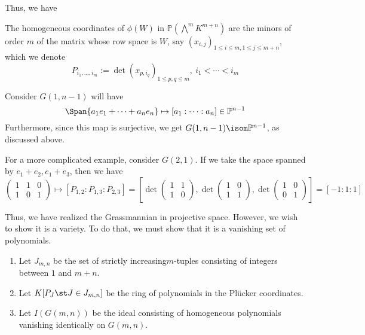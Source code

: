 \documentclass[11pt,leqno,oneside]{amsart}
\numberwithin{thm}{section}
\renewcommand{\P}{\mathbb{P}}
\newcommand{\ExtP}{\bigwedge}
\begin{document}
Thus, we have
\begin{thm}
  The homogeneous coordinates of \(\phi(W)\) in \(\P(\ExtP^m
  K^{m+n})\) are the minors of order \(m\) of the matrix whose row
  space is \(W\), say \((x_{i,j})_{1 \leq i \leq m, 1 \leq j \leq
    m+n}\), which we denote \[
    P_{i_1, \ldots, i_m} := \det(x_{p,i_q})_{1
      \leq p,q \leq m}, \ i_1 
    < \cdots < i_m
  \]
\end{thm}
\begin{example}
  Consider \(G(1,n-1)\) will have \[
    \Span\{a_1 e_1 + \cdots + a_n e_n\} \mapsto [a_1: \cdots :a_n] \in
    \P^{n-1} 
  \]
  Furthermore, since this map is surjective, we get \(G(1,n-1) \isom
  \P^{n-1}\), as discussed above.

  For a more complicated example, consider \(G(2,1)\). If we take the
  space spanned by \(e_1+e_2,e_1+e_3\), then we have \[
    \left(
      \begin{array}{ccc}
        1&1&0\\
        1&0&1
      \end{array}
\right) \mapsto [P_{1,2}:P_{1,3}:P_{2,3}] = \left[ \det \left(
    \begin{array}{cc}
      1&1\\
      1&0
    \end{array}
\right), \det \left(
  \begin{array}{cc}
    1&0\\
    1&1
  \end{array}
\right), \det \left(
  \begin{array}{cc}
    1&0\\
    0&1
  \end{array}
\right) \right] = [-1:1:1]
  \]
  
\end{example}
Thus, we have realized the Grassmannian in projective
space. However, we wish to show it is a variety. To do that, we must
show that it is a vanishing set of polynomials.
\begin{defn}
  \begin{enumerate}
  \item Let \(J_{m,n}\) be the set of strictly increasing\(m\)-tuples
  consisting of integers between \(1\) and \(m+n\).
  \item Let \(K[P_J \st J \in J_{m,n}]\) be the ring of polynomials in
    the Pl\"{u}cker coordinates.
  \item Let \(I(G(m,n))\) be the ideal consisting of homogeneous
    polynomials vanishing identically on \(G(m,n)\). 
  \end{enumerate}
\end{defn}
\end{document}
